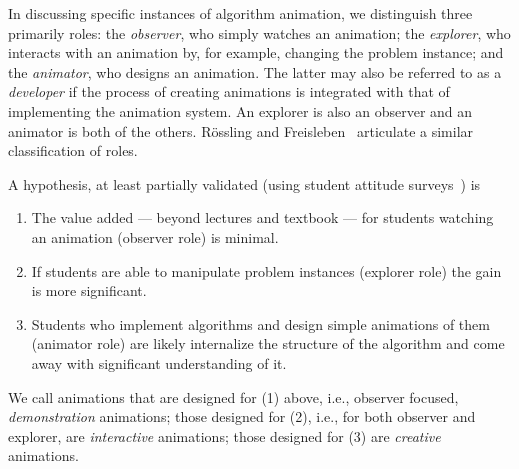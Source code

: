 In discussing specific instances of algorithm animation,
we distinguish three primarily roles: the \emph{observer}, who simply
watches an animation; the \emph{explorer}, who interacts with an animation by,
for example, changing the problem instance; and the \emph{animator}, who
designs an animation. The latter may also be referred to as a
\emph{developer} if the process of creating animations is integrated with
that of implementing the animation system. An explorer is also an observer and an animator is both of
the others.
R\"ossling and Freisleben~\cite{2002-JVLC-Roessling} articulate a similar
classification of roles.


A hypothesis, at least partially validated (using student attitude
surveys~\cite{1997-SIGCSE-Stasko}) is
\begin{enumerate}
  \item
    The value added --- beyond lectures and textbook
    --- for students watching an animation (observer role)
    is minimal.
  \item
    If students are able to manipulate problem instances (explorer role)
    the gain is more significant.
  \item
    Students who implement algorithms and design simple animations of them
    (animator role) are likely internalize the structure of the algorithm and
    come away with significant understanding of it.
\end{enumerate}

We call animations that are designed for (1) above, i.e., observer focused,
\emph{demonstration} animations;
those designed for (2), i.e., for both observer and explorer, are
\emph{interactive} animations; those designed for (3) are
\emph{creative} animations.


